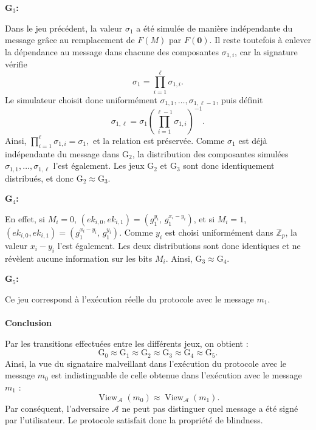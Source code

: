 \noindent\textbf{G$_3$:}

Dans le jeu précédent, la valeur $\sigma_1$ a été simulée de manière
indépendante du message grâce au remplacement de $F(M)$ par $F(\mathbf{0})$.
Il reste toutefois à enlever la dépendance au message dans chacune des
composantes $\sigma_{1,i}$, car la signature vérifie
\[
\sigma_1=\prod_{i=1}^{\ell}\sigma_{1,i}.
\]
Le simulateur choisit donc uniformément
$\sigma_{1,1},\ldots,\sigma_{1,\ell-1}$, puis définit 
\[
\sigma_{1,\ell}
=
\sigma_1
\left(
\prod_{i=1}^{\ell-1}\sigma_{1,i}
\right)^{-1}.
\]
Ainsi,
$
\prod_{i=1}^{\ell}\sigma_{1,i}
=
\sigma_1,
$
et la relation est préservée. Comme $\sigma_1$ est déjà indépendante du message dans G$_2$,
la distribution des composantes simulées
$\sigma_{1,1},\ldots,\sigma_{1,\ell}$ l'est également. Les jeux $\mathrm{G}_2$ et $\mathrm{G}_3$ 
sont donc identiquement distribués, et donc
$\mathrm{G}_2 \approx \mathrm{G}_3$.


\noindent\textbf{G$_4$:}

En effet, si $M_i=0$,
$(ek_{i,0},ek_{i,1})=\left(g_1^{y_i},\,g_1^{x_i-y_i}\right)$,
et si $M_i=1$,
$(ek_{i,0},ek_{i,1})=\left(g_1^{x_i-y_i},\,g_1^{y_i}\right).$
Comme $y_i$ est choisi uniformément dans $\mathbb{Z}_p$, la valeur $x_i-y_i$ l'est également. Les deux distributions sont donc identiques et ne révèlent aucune information sur les bits $M_i$. Ainsi,
$\text{G}_3 \approx \text{G}_4$.


\noindent\textbf{G$_5$:}

Ce jeu correspond à l'exécution réelle du protocole avec le message $m_1$.\\\\

\noindent\textbf{Conclusion}

Par les transitions effectuées entre les différents jeux, on obtient :
\[
\text{G}_0 \approx \text{G}_1 \approx \text{G}_2 \approx \text{G}_3 \approx \text{G}_4 \approx \text{G}_5.
\]
Ainsi, la vue du signataire malveillant dans l'exécution du protocole avec le message $m_0$ est indistinguable de celle obtenue dans l'exécution avec le message $m_1$ :
\[
\operatorname{View}_{\mathcal{A}}(m_0) \approx \operatorname{View}_{\mathcal{A}}(m_1).
\]
Par conséquent, l'adversaire $\mathcal{A}$ ne peut pas distinguer quel message a été signé par l'utilisateur. Le protocole satisfait donc la propriété de blindness.


